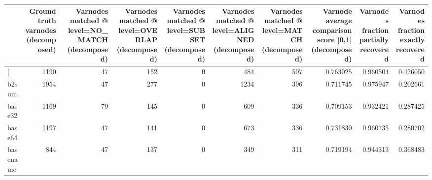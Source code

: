 \begin{tabular}{lrrrrrrrrr}
\toprule
{} &  Ground truth varnodes (decomposed) &  Varnodes matched @ level=NO\_MATCH (decomposed) &  Varnodes matched @ level=OVERLAP (decomposed) &  Varnodes matched @ level=SUBSET (decomposed) &  Varnodes matched @ level=ALIGNED (decomposed) &  Varnodes matched @ level=MATCH (decomposed) &  Varnode average comparison score [0,1] (decomposed) &  Varnodes fraction partially recovered &  Varnodes fraction exactly recovered \\
\midrule
[         &                                1190 &                                              47 &                                            152 &                                             0 &                                            484 &                                          507 &                                           0.763025 &                               0.960504 &                             0.426050 \\
b2sum     &                                1954 &                                              47 &                                            277 &                                             0 &                                           1234 &                                          396 &                                           0.711745 &                               0.975947 &                             0.202661 \\
base32    &                                1169 &                                              79 &                                            145 &                                             0 &                                            609 &                                          336 &                                           0.709153 &                               0.932421 &                             0.287425 \\
base64    &                                1197 &                                              47 &                                            141 &                                             0 &                                            673 &                                          336 &                                           0.731830 &                               0.960735 &                             0.280702 \\
basename  &                                 844 &                                              47 &                                            137 &                                             0 &                                            349 &                                          311 &                                           0.719194 &                               0.944313 &                             0.368483 \\

\end{tabular}
